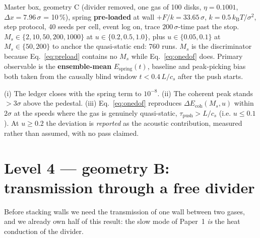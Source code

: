 \documentclass[11pt,a4paper]{article}
\newcommand{\kT}{k_{\mathrm B}T}
\begin{document}
\begin{run}
Master box, geometry C (divider removed, one gas of 100 disks, $\eta = 0.1001$,
$\Delta x = 7.96\,\sigma$ = 10\,\%), spring \textbf{pre-loaded} at wall $+ F/k = 33.65\,\sigma$,
$k = 0.5\,\kT/\sigma^2$, step protocol, 40 seeds per cell, event log on, trace $200\,\sigma$-time
past the stop. $M_s \in \{2,10,50,200,1000\}$ at $u \in \{0.2, 0.5, 1.0\}$, plus $u \in \{0.05,0.1\}$
at $M_s \in \{50,200\}$ to anchor the quasi-static end: 760 runs.
$M_s$ is the discriminator because Eq.~\eqref{eq:preload} contains no $M_s$ while
Eq.~\eqref{eq:onedof} does.
Primary observable is the \textbf{ensemble-mean} $E_{\mathrm{spring}}(t)$, baseline and
peak-picking bias both taken from the causally blind window $t < 0.4\,L/c_s$ after the push starts.
\end{run}
\begin{pass}
(i) The ledger closes with the spring term to $10^{-8}$.
(ii) The coherent peak stands $>3\sigma$ above the pedestal.
(iii) Eq.~\eqref{eq:onedof} reproduces $\Delta E_{\mathrm{coh}}(M_s, u)$ within $2\sigma$ at the
speeds where the gas is genuinely quasi-static, $\tau_{\mathrm{push}} > L/c_s$ (i.e. $u \le 0.1$).
At $u \ge 0.2$ the deviation is \emph{reported} as the acoustic contribution, measured rather than
assumed, with no pass claimed.
\end{pass}
\section{Level 4 --- geometry B: transmission through a free divider}

\begin{why}
Before stacking walls we need the transmission of one wall between two gases, and we already own half of this result: the slow mode of Paper~1 \emph{is} the heat conduction of the divider.
\end{why}
\end{document}
